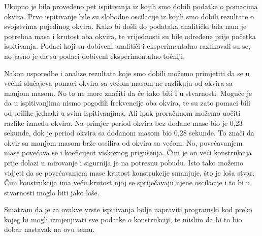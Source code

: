 \documentclass[12pt]{book}
\begin{document}
Ukupno je bilo provedeno pet ispitivanja iz kojih smo dobili podatke o pomacima okvira. Prvo ispitivanje bile su slobodne oscilacije iz kojih smo dobili rezultate o svojstvima pojedinog okvira. Kako bi došli do podataka analitički bila nam je potrebna masa i krutost oba okvira, te vrijednosti su bile određene prije početka ispitivanja. Podaci koji su dobiveni analitiči i eksperimentalno razlikovali su se, no jasno je da su podaci dobiveni eksperimentalno točniji.

Nakon usporedbe i analize rezultata koje smo dobili možemo primjetiti da se u većini slučajeva pomaci okvira sa većom masom ne razlikuju od okvira sa manjom masom. No to ne more značiti da će tako biti i u stvarnosti. Moguće je da u ispitivanjima nismo pogodili frekvencije oba okvira, te su zato pomaci bili od prilike jednaki u svim ispitivanjima. Ali ipak proračunom možemo uočiti razlike između okvira. Na primjer period okvira bez dodane mase bio je 0,23 sekunde, dok je period okvira sa dodanom masom bio 0,28 sekunde. To znači da okvir sa manjom masom brže oscilira od okvira sa većom. No, povećavanjem mase povećava se i koeficijent viskoznog prigušenja. Čim je on veći konstrukcija prije dolazi u mirovanje i sigurnija je na potresnu pobudu. Isto tako možemo vidjeti da se povećavanjem mase krutost konstrukcije smanjuje, što je loša stvar. Čim konstrukcija ima veću krutost njoj se spriječavaju njene oscilacije i to bi u stvarnosti moglo biti jako loše.

Smatram da je za ovakve vrste ispitivanja bolje napraviti programski kod preko kojeg bi mogli izmjenjivati sve podatke o konstrukciji, te mislim da bi to bio dobar nastavak na ovu temu.


\cleardoublepage{}

\vspace{\baselineskip}
\renewcommand{\bibname}{\uppercase{Literatura}}



\end{document}
